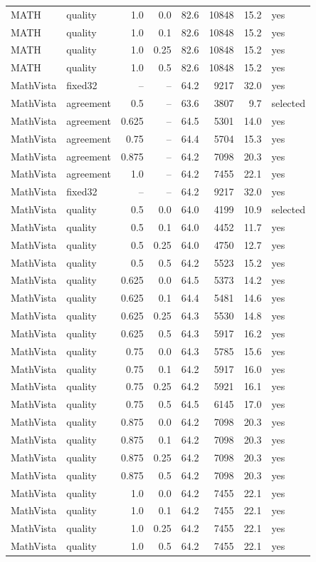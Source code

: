 \begin{table}[t]
\begin{tabular}{llrrrrrl}
MATH & quality & 1.0 & 0.0 & 82.6 & 10848 & 15.2 & yes \\
MATH & quality & 1.0 & 0.1 & 82.6 & 10848 & 15.2 & yes \\
MATH & quality & 1.0 & 0.25 & 82.6 & 10848 & 15.2 & yes \\
MATH & quality & 1.0 & 0.5 & 82.6 & 10848 & 15.2 & yes \\
MathVista & fixed32 & – & – & 64.2 & 9217 & 32.0 & yes \\
MathVista & agreement & 0.5 & – & 63.6 & 3807 & 9.7 & selected \\
MathVista & agreement & 0.625 & – & 64.5 & 5301 & 14.0 & yes \\
MathVista & agreement & 0.75 & – & 64.4 & 5704 & 15.3 & yes \\
MathVista & agreement & 0.875 & – & 64.2 & 7098 & 20.3 & yes \\
MathVista & agreement & 1.0 & – & 64.2 & 7455 & 22.1 & yes \\
MathVista & fixed32 & – & – & 64.2 & 9217 & 32.0 & yes \\
MathVista & quality & 0.5 & 0.0 & 64.0 & 4199 & 10.9 & selected \\
MathVista & quality & 0.5 & 0.1 & 64.0 & 4452 & 11.7 & yes \\
MathVista & quality & 0.5 & 0.25 & 64.0 & 4750 & 12.7 & yes \\
MathVista & quality & 0.5 & 0.5 & 64.2 & 5523 & 15.2 & yes \\
MathVista & quality & 0.625 & 0.0 & 64.5 & 5373 & 14.2 & yes \\
MathVista & quality & 0.625 & 0.1 & 64.4 & 5481 & 14.6 & yes \\
MathVista & quality & 0.625 & 0.25 & 64.3 & 5530 & 14.8 & yes \\
MathVista & quality & 0.625 & 0.5 & 64.3 & 5917 & 16.2 & yes \\
MathVista & quality & 0.75 & 0.0 & 64.3 & 5785 & 15.6 & yes \\
MathVista & quality & 0.75 & 0.1 & 64.2 & 5917 & 16.0 & yes \\
MathVista & quality & 0.75 & 0.25 & 64.2 & 5921 & 16.1 & yes \\
MathVista & quality & 0.75 & 0.5 & 64.5 & 6145 & 17.0 & yes \\
MathVista & quality & 0.875 & 0.0 & 64.2 & 7098 & 20.3 & yes \\
MathVista & quality & 0.875 & 0.1 & 64.2 & 7098 & 20.3 & yes \\
MathVista & quality & 0.875 & 0.25 & 64.2 & 7098 & 20.3 & yes \\
MathVista & quality & 0.875 & 0.5 & 64.2 & 7098 & 20.3 & yes \\
MathVista & quality & 1.0 & 0.0 & 64.2 & 7455 & 22.1 & yes \\
MathVista & quality & 1.0 & 0.1 & 64.2 & 7455 & 22.1 & yes \\
MathVista & quality & 1.0 & 0.25 & 64.2 & 7455 & 22.1 & yes \\
MathVista & quality & 1.0 & 0.5 & 64.2 & 7455 & 22.1 & yes \\
\bottomrule
\end{tabular}
\end{table}
